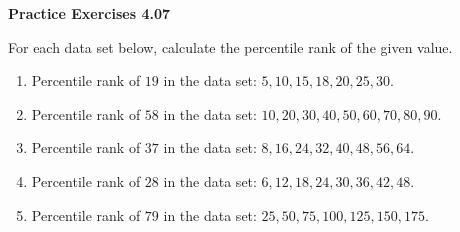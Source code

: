 \vspace{0.3ex}
\noindent\textbf{Practice Exercises 4.07}

\vspace{0.2ex}

For each data set below, calculate the percentile rank of the given value.  

\begin{enumerate}
    \item Percentile rank of \(19\) in the data set: \(5, 10, 15, 18, 20, 25, 30\).  
    \item Percentile rank of \(58\) in the data set: \(10, 20, 30, 40, 50, 60, 70, 80, 90\).  
    \item Percentile rank of \(37\) in the data set: \(8, 16, 24, 32, 40, 48, 56, 64\).  
    \item Percentile rank of \(28\) in the data set: \(6, 12, 18, 24, 30, 36, 42, 48\).  
    \item Percentile rank of \(79\) in the data set: \(25, 50, 75, 100, 125, 150, 175\).  
\end{enumerate}
